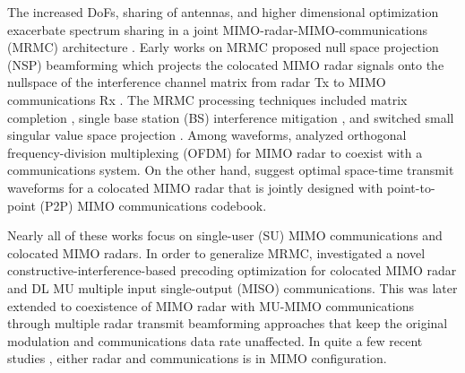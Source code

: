 \documentclass[9pt,journal]{IEEEtran}
\theoremstyle{definition}
\begin{document}
The increased DoFs, sharing of antennas, and higher dimensional optimization exacerbate spectrum sharing in a joint MIMO-radar-MIMO-communications (MRMC) architecture \cite{alaee2020information,dokhanchi2020multi}. %
Early works on MRMC proposed null space projection (NSP) beamforming which projects the colocated MIMO radar signals onto the nullspace of the interference channel matrix from radar Tx to MIMO communications Rx \cite{khawar2015target}. The MRMC processing techniques included matrix completion %
\cite{MCMIMO_RadComm}, single base station (BS) interference mitigation \cite{khawar2015target}, and switched small singular value space projection %
\cite{mahal2017spectral}. %
Among waveforms, \cite{bao2019precoding} analyzed orthogonal frequency-division multiplexing (OFDM) for MIMO radar to coexist with a communications system. On the other hand, \cite{qian2018joint,rihan2018optimum} suggest optimal space-time transmit waveforms for a colocated MIMO radar that is jointly designed with point-to-point (P2P) MIMO communications codebook.
	
	Nearly all of these works focus on single-user (SU) MIMO communications and colocated MIMO radars. In order to generalize MRMC, \cite{liu2018mimo} investigated a novel constructive-interference-based precoding optimization for colocated MIMO radar and DL MU multiple input single-output (MISO) communications. This was later extended to coexistence of MIMO radar with MU-MIMO communications \cite{liu2018mu} through multiple radar transmit beamforming approaches that keep the original modulation and communications data rate unaffected. In quite a few recent studies \cite{d2020uplink,grossi2020joint}, either radar and communications is in MIMO configuration. %
	
\end{document}
